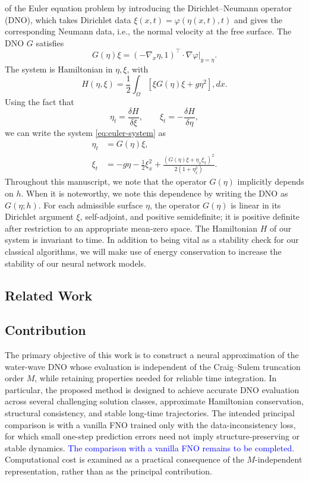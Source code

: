 \documentclass{article}
\begin{document}
of the Euler equation problem by introducing the Dirichlet--Neumann operator
(DNO), which takes Dirichlet data $\xi(x,t)=\varphi(\eta(x,t),t)$ and gives
the corresponding Neumann data, i.e., the normal velocity at the free surface.
The DNO $G$ satisfies
\[
    G(\eta)\xi=(-\nabla_x\eta,1)^\top\cdot\nabla\varphi|_{y=\eta}.
\]
The system is Hamiltonian in $\eta,\xi$, with
\begin{equation}
    H(\eta,\xi)=\frac12\int_\Omega[\xi G(\eta)\xi+g\eta^2],dx.
    \label{eq:hamiltonian}
\end{equation}
Using the fact that
\begin{equation}
    \eta_t=\frac{\delta H}{\delta\xi},\qquad
    \xi_t=-\frac{\delta H}{\delta\eta},
    \label{eq:hamiltons-equations}
\end{equation}
we can write the system \eqref{eq:euler-system} as
\begin{equation}
\begin{aligned}
    \eta_t &= G(\eta)\xi,\\
    \xi_t &= -g\eta-\frac12\xi_x^2
      +\frac{(G(\eta)\xi+\eta_x\xi_x)^2}{2(1+\eta_x^2)}.
\end{aligned}
\label{eq:hamiltonian-system}
\end{equation}
Throughout this manuscript, we note that the operator $G(\eta)$ implicitly
depends on $h$. When it is noteworthy, we note this dependence by writing the
DNO as $G(\eta;h)$. For each admissible surface $\eta$, the operator $G(\eta)$
is linear in its Dirichlet argument $\xi$, self-adjoint, and positive
semidefinite; it is positive definite after restriction to an appropriate
mean-zero space.
The Hamiltonian $H$ of our system is invariant to time. In addition to being
vital as a stability check for our classical algorithms, we will make use of
energy conservation to increase the stability of our neural network models.

\subsection{Related Work}

\subsection{Contribution}
The primary objective of this work is to construct a neural approximation
of the water-wave DNO whose evaluation is independent of the Craig--Sulem
truncation order $M$, while retaining properties needed for reliable time
integration. In particular, the proposed method is designed to achieve
accurate DNO evaluation across several challenging solution classes,
approximate Hamiltonian conservation, structural consistency, and stable
long-time trajectories. The intended principal comparison is with a vanilla
FNO trained only with the data-inconsistency loss, for which small one-step
prediction errors need not imply structure-preserving or stable dynamics.
\textcolor{blue}{The comparison with a vanilla FNO remains to be completed.}
Computational cost is examined as a practical consequence of the
$M$-independent representation, rather than as the principal contribution.
\end{document}
